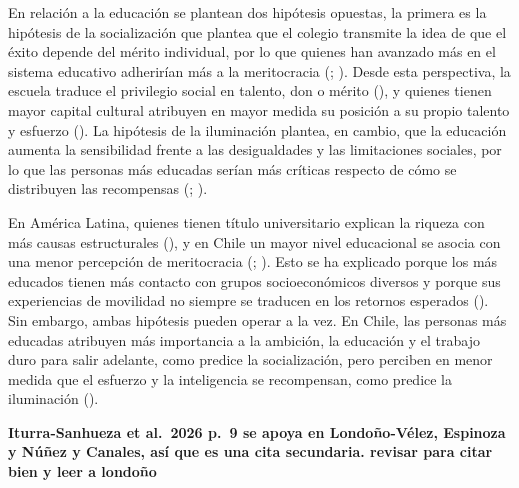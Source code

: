 \documentclass[
  spanish,
  a4paper,
  oneside]{scrbook}
\begin{document}
En relación a la educación se plantean dos hipótesis opuestas, la
primera es la hipótesis de la socialización que plantea que el colegio
transmite la idea de que el éxito depende del mérito individual, por lo
que quienes han avanzado más en el sistema educativo adherirían más a la
meritocracia (; ). Desde esta perspectiva, la escuela traduce el privilegio social
en talento, don o mérito
(), y
quienes tienen mayor capital cultural atribuyen en mayor medida su
posición a su propio talento y esfuerzo
(). La
hipótesis de la iluminación plantea, en cambio, que la educación aumenta
la sensibilidad frente a las desigualdades y las limitaciones sociales,
por lo que las personas más educadas serían más críticas respecto de
cómo se distribuyen las recompensas
(;
).

En América Latina, quienes tienen título universitario explican la
riqueza con más causas estructurales
(), y en Chile un
mayor nivel educacional se asocia con una menor percepción de
meritocracia (;
). Esto se ha explicado porque los más educados tienen más contacto
con grupos socioeconómicos diversos y porque sus experiencias de
movilidad no siempre se traducen en los retornos esperados
(). Sin embargo, ambas hipótesis pueden operar a la vez. En
Chile, las personas más educadas atribuyen más importancia a la
ambición, la educación y el trabajo duro para salir adelante, como
predice la socialización, pero perciben en menor medida que el esfuerzo
y la inteligencia se recompensan, como predice la iluminación
().

\textbf{Iturra-Sanhueza et al.~2026 p.~9 se apoya en Londoño-Vélez,
Espinoza y Núñez y Canales, así que es una cita secundaria. revisar para
citar bien y leer a londoño}
\end{document}
